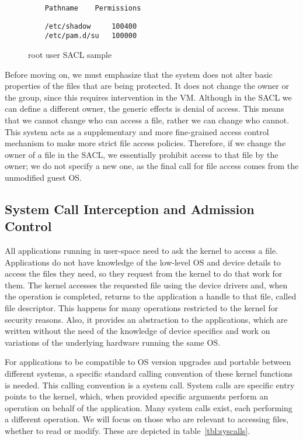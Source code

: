 \begin{figure}[ht]
	\centering
	\begin{lstlisting}
	Pathname	Permissions	
	\end{lstlisting}
	\footnotesize{\selectfont 
	\begin{lstlisting}
	/etc/shadow     100400
	/etc/pam.d/su   100000
	\end{lstlisting}}
	\caption{root user \ac{SACL} sample}
	\label{fig:root_sacl}
\end{figure}


\par Before moving on, we must emphasize that the system does not alter basic properties of the files that are being protected. It does not change the owner or the group, since this requires intervention in the \ac{VM}. Although in the \ac{SACL} we can define a different owner, the generic effects is denial of access. This means that we cannot change who can access a file, rather we can change who cannot. This system acts as a supplementary and more fine-grained access control mechanism to make more strict file access policies. Therefore, if we change the owner of a file in the \ac{SACL}, we essentially prohibit access to that file by the owner; we do not specify a new one, as the final call for file access comes from the unmodified guest \ac{OS}.



\subsection{System Call Interception and Admission Control}\label{sub:syscalls}


\par All applications running in user-space need to ask the kernel to access a file. Applications do not have knowledge of the low-level \ac{OS} and device details to access the files they need, so they request from the kernel to do that work for them. The kernel accesses the requested file using the device drivers and, when the operation is completed, returns to the application a handle to that file, called file descriptor. This happens for many operations restricted to the kernel for security reasons. Also, it provides an abstraction to the applications, which are written without the need of the knowledge of device specifics and work on variations of the underlying hardware running the same \ac{OS}. 

\par For applications to be compatible to \ac{OS} version upgrades and portable between different systems, a specific standard calling convention of these kernel functions is needed. This calling convention is a system call. System calls are specific entry points to the kernel, which, when provided specific arguments perform an operation on behalf of the application. Many system calls exist, each performing a different operation. We will focus on those who are relevant to accessing files, whether to read or modify. These are depicted in table~\ref{tbl:syscalls}.

